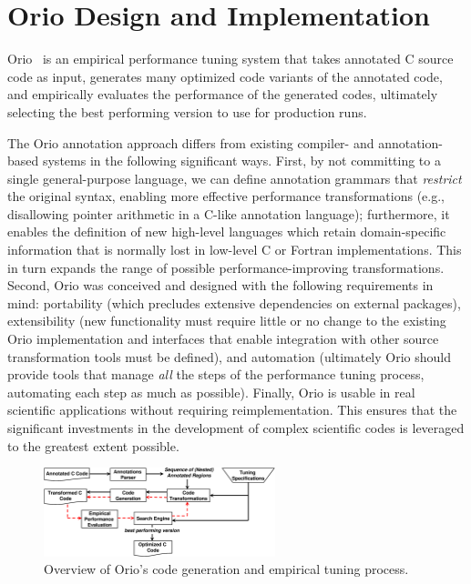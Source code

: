 \section{Orio Design and Implementation}
\label{sec:implm}

Orio~\cite{OrioURL} is an empirical performance tuning system that takes
annotated C source code as input, generates many optimized code variants of
the annotated code, and empirically evaluates the performance of the
generated codes, ultimately selecting the best performing version to use for
production runs.

The Orio annotation approach differs from existing compiler- and
annotation-based systems in the following significant ways.
%
First, by not committing to a single general-purpose language, we can define 
annotation grammars that \emph{restrict} the original syntax, enabling more
effective performance transformations (e.g., disallowing pointer arithmetic
in a C-like annotation language); furthermore, it enables the definition of
new high-level languages which retain domain-specific
information that is normally lost in low-level C or Fortran
implementations. This in turn expands the range of possible performance-improving 
transformations.
%
Second, Orio was conceived and designed with the following requirements in mind: 
portability (which precludes extensive dependencies on external packages),
extensibility (new functionality must require little or no change to the
existing Orio implementation and interfaces that enable integration with
other source transformation tools must be defined), and automation
(ultimately Orio should provide tools that manage
\emph{all} the steps of the performance tuning process, automating each step 
as much as possible).
%
Finally, Orio is usable in real scientific applications without
requiring reimplementation. This ensures that the significant investments in
the development of complex scientific codes is leveraged to the greatest
extent possible.

\begin{figure}%
\begin{center}
\includegraphics[width=0.6\textwidth]{figures/orio.eps}   
\end{center}
\caption{Overview of Orio's code generation and empirical tuning process.}  
\label{fig:orio}
\end{figure}  

